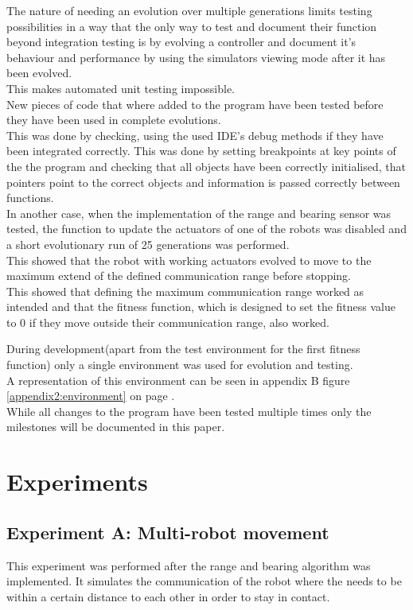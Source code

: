 The nature of needing an evolution over multiple generations limits testing possibilities in a way that the only way to test and document their function beyond integration testing is by evolving a controller and document it's behaviour and performance by using the simulators viewing mode after it has been evolved.\\
This makes automated unit testing impossible.\\
New pieces of code that where added to the program have been tested before they have been used in complete evolutions.\\
This was done by checking, using the used IDE's debug methods  if they have been integrated correctly. This was done by setting breakpoints at key points of the the program and checking that all objects have been correctly initialised, that pointers point to the correct objects and information is passed correctly between functions.\\
In another case, when the implementation of the range and bearing sensor was tested, the function to update the actuators of one of the robots was disabled and a short evolutionary run of 25 generations was performed.\\
This showed that the robot with working actuators evolved to move to the maximum extend of the defined communication range before stopping. \\
This showed that defining the maximum communication range worked as intended and that the fitness function, which is designed to set the fitness value to 0 if they move outside their communication range, also worked.

During development(apart from the test environment for the first fitness function) only a single environment was used for evolution and testing.\\
A representation of this environment can be seen in appendix B figure \ref{appendix2:environment} on page \pageref{appendix2:environment}.\\
While all changes to the program have been tested multiple times only the milestones will be documented in this paper. \\


\section{Experiments}
\subsection{Experiment A: Multi-robot movement}
\label{chap4:movement}
This experiment was performed after the range and bearing algorithm was implemented. It simulates the communication of the robot where the needs to be within a certain distance to each other in order to stay in contact.\\

